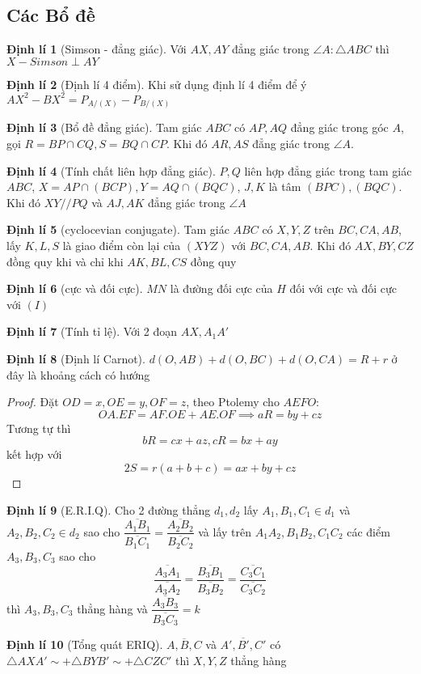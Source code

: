 \documentclass[12pt,a4paper]{article}
\theoremstyle{definition}
\newtheorem{theorem}{Định lí}[section]
\theoremstyle{remark}
\begin{document}
\subsection{Các Bổ đề}
\begin{theorem}[Simson - đẳng giác]
Với $AX,AY$ đẳng giác trong $\angle A: \triangle ABC$ thì $X-Simson\perp AY$
\end{theorem}
\begin{theorem}[Định lí 4 điểm]
Khi sử dụng định lí 4 điểm để ý $AX^2-BX^2=P_{A/(X)}-P_{B/(X)}$
\end{theorem}
\begin{theorem}[Bổ đề đẳng giác]
  Tam giác $ABC$ có $AP,AQ$ đẳng giác trong góc $A$, gọi $R=BP\cap CQ, S=BQ\cap CP$. Khi đó
  $AR,AS$ đẳng giác trong $\angle A$.
\end{theorem}
\begin{theorem}[Tính chất liên hợp đẳng giác]
$P,Q$ liên hợp đẳng giác trong tam giác $ABC$, $X=AP\cap (BCP),Y=AQ\cap (BQC)$, $J,K$ là tâm $(BPC),(BQC)$. Khi đó $XY//PQ$ và $AJ,AK$ đẳng giác trong $\angle A$
\end{theorem}
\begin{theorem}[cyclocevian conjugate]
Tam giác $ABC$ có $X,Y,Z$ trên $BC,CA,AB$, lấy $K,L,S$ là giao điểm còn lại của $(XYZ)$ với $BC,CA,AB$. Khi đó $AX,BY,CZ$ đồng quy khi và chỉ khi $AK,BL,CS$ đồng quy
\end{theorem}
\begin{theorem}[cực và đối cực]
$MN$ là đường đối cực của $H$ đối với cực và đối cực với $(I)$
\end{theorem}
\begin{theorem}[Tính tỉ lệ]
Với 2 đoạn $AX,A_1A'$
\end{theorem}
\begin{theorem}[Định lí Carnot]
$d(O,AB)+d(O,BC)+d(O,CA)=R+r$ ở đây là khoảng cách có hướng
\end{theorem}
\begin{proof}
Đặt $OD=x, OE=y, OF=z$, theo Ptolemy cho $AEFO$: $$OA.EF=AF.OE+AE.OF \implies aR=by+cz$$
Tương tự thì
$$bR=cx+az, cR=bx+ay$$
kết hợp với $$2S=r(a+b+c)=ax+by+cz$$
\end{proof}
\begin{theorem}[E.R.I.Q]
Cho 2 đường thẳng $d_1,d_2$ lấy $A_1,B_1,C_1\in d_1$ và $A_2,B_2,C_2\in d_2$ sao cho $\dfrac{\overline{A_1B_1}}{\overline{B_1C_1}}=\dfrac{\overline{A_2B_2}}{\overline{B_2C_2}}$
và lấy trên $A_1A_2,B_1B_2,C_1C_2$ các điểm $A_3,B_3,C_3$ sao cho 
$$\dfrac{\overline{A_3A_1}}{\overline{A_3A_2}}=\dfrac{\overline{B_3B_1}}{\overline{B_3B_2}}=\dfrac{\overline{C_3C_1}}{\overline{C_3C_2}}$$ thì $A_3,B_3,C_3$ thẳng hàng và $\dfrac{\overline{A_3B_3}}{\overline{B_3C_3}}=k$
\end{theorem}
\begin{theorem}[Tổng quát ERIQ]
$\overline{A,B,C}$ và $\overline{A',B',C'}$ có $\triangle AXA'\sim + \triangle BYB'\sim + \triangle CZC'$ thì $X,Y,Z$ thẳng hàng
\end{theorem}
\end{document}
